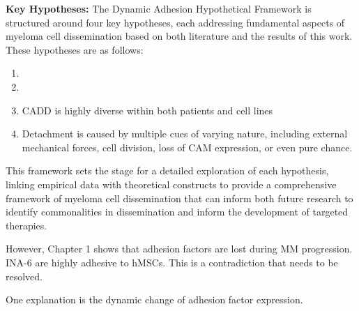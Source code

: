 \newcommand{\cadddiversity}{%
      \ac{CADD} is highly diverse within both patients and cell lines %
}%
\newcommand{\cadddiversitytitle}{ %
      \textit{Hypothesis 3}: \ac{CADD} is Highly Diverse Within both Patients
      and Cell Lines%
}%


\newcommand{\caddtrigger}{%
      Detachment is caused by multiple cues of varying nature, including
      external mechanical forces, cell division, loss of \ac{CAM} expression, or
      even pure chance. }%
\newcommand{\caddtriggertitle}{ %
      \textit{Hypothesis 4}: Detachment is Caused by Multiple Cues of Varying
      Nature %
}%




\textbf{Key Hypotheses:}
The Dynamic Adhesion Hypothetical Framework is structured around four key
hypotheses, each addressing fundamental aspects of myeloma cell dissemination
based on both literature and the results of this work. These hypotheses are as
follows:
\begin{enumerate}
      \item \caddadaptation
      \item \caddadaptibility
      \item \cadddiversity
      \item \caddtrigger
\end{enumerate}

This framework sets the stage for a detailed exploration of each hypothesis,
linking empirical data with theoretical constructs to provide a comprehensive
framework of myeloma cell dissemination that can inform both future research
to identify commonalities in dissemination and inform the development of targeted
therapies.



\unnsubsection{\caddadaptationtitle}%
\label{sec:discussion_caddadaptation}%
However,  Chapter 1 shows that adhesion factors are
lost during MM progression. INA-6 are highly adhesive to hMSCs.
This is a contradiction that needs to be resolved.

One explanation is the dynamic change of adhesion factor expression.


